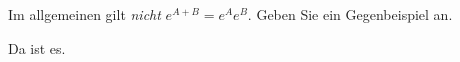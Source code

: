 \begin{exercise}
Im allgemeinen gilt \textit{nicht} $e^{A + B} = e^Ae^B$. Geben Sie ein
Gegenbeispiel an.
\end{exercise}
\begin{solution}
Da ist es.
\end{solution}
